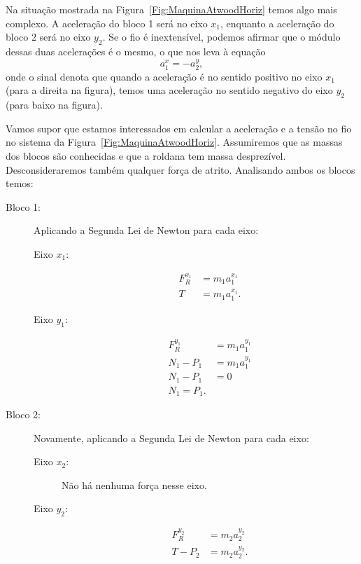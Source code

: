 Na situação mostrada na Figura~\ref{Fig:MaquinaAtwoodHoriz} temos algo mais complexo. A aceleração do bloco 1 será no eixo $x_1$, enquanto a aceleração do bloco 2 será no eixo $y_2$. Se o fio é inextensível, podemos afirmar que o módulo dessas duas acelerações é o mesmo, o que nos leva à equação
\begin{equation}\label{Eq:AtwoodHorizRelAcel}
    a_1^x = - a_2^y,
\end{equation}
%
onde o sinal denota que quando a aceleração é no sentido positivo no eixo $x_1$ (para a direita na figura), temos uma aceleração no sentido negativo do eixo $y_2$ (para baixo na figura).

Vamos supor que estamos interessados em calcular a aceleração e a tensão no fio no sistema da Figura~\ref{Fig:MaquinaAtwoodHoriz}. Assumiremos que as massas dos blocos são conhecidas e que a roldana tem massa desprezível. Desconsideraremos também qualquer força de atrito. Analisando ambos os blocos temos:
\begin{description}
    \item[Bloco 1:] Aplicando a Segunda Lei de Newton para cada eixo:
        \begin{description}
            \item[Eixo $x_1$:]
                \begin{align}
                    F_R^{x_1} &= m_1 a_1^{x_1} \\
                    T & = m_1 a_1^{x_1}. \label{Eq:AtwoodHorizX1}
                \end{align}
            \item[Eixo $y_1$:]
                \begin{align}
                    F_R^{y_1} &= m_1 a_1^{y_1} \\
                    N_1 - P_1 &= m_1 a_1^{y_1} \\
                    N_1 - P_1 &= 0 \\
                    N_1 = P_1.
                \end{align}
        \end{description}
    \item[Bloco 2:] Novamente, aplicando a Segunda Lei de Newton para cada eixo:
        \begin{description}
            \item[Eixo $x_2$:] Não há nenhuma força nesse eixo.
            \item[Eixo $y_2$:]
                \begin{align}
                    F_R^{y_2} &= m_2 a_2^{y_2} \\
                    T - P_2 &= m_2 a_2^{y_2}. \label{Eq:AtwoodHorizY2}
                \end{align}
        \end{description}
\end{description}

